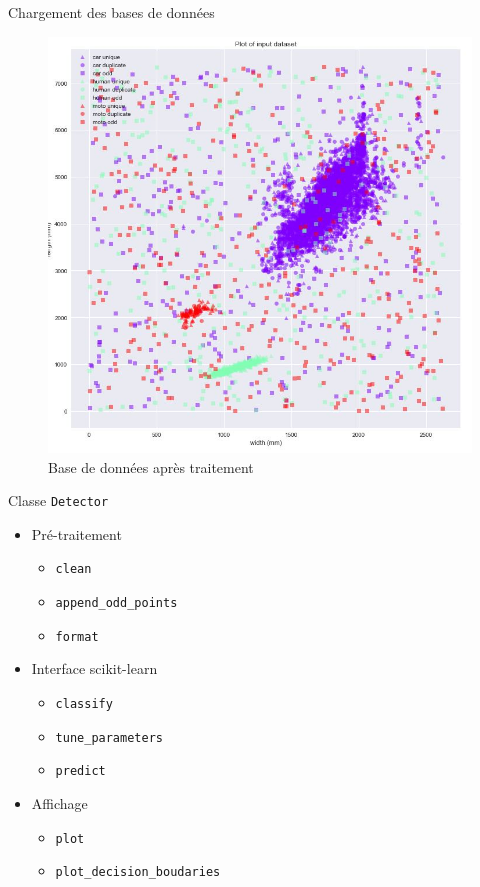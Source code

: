 \documentclass[usenames,dvipsnames]{beamer}
\begin{document}
\begin{frame}{Chargement des bases de données}
\begin{figure}
\centering
\includegraphics[width=.56\textwidth]{img/detector_plot.jpg}
\caption{Base de données après traitement}
\end{figure}
\end{frame}

\begin{frame}{Classe \texttt{Detector}}
\begin{itemize}
\item Pré-traitement \begin{itemize}
\item \texttt{clean}
\item \texttt{append\_odd\_points}
\item \texttt{format}
\end{itemize}
\item Interface scikit-learn \begin{itemize}
\item \texttt{classify}
\item \texttt{tune\_parameters}
\item \texttt{predict}
\end{itemize}
\item Affichage \begin{itemize}
\item \texttt{plot}
\item  \texttt{plot\_decision\_boudaries}
\end{itemize}
\end{itemize}
\end{frame}
\end{document}
